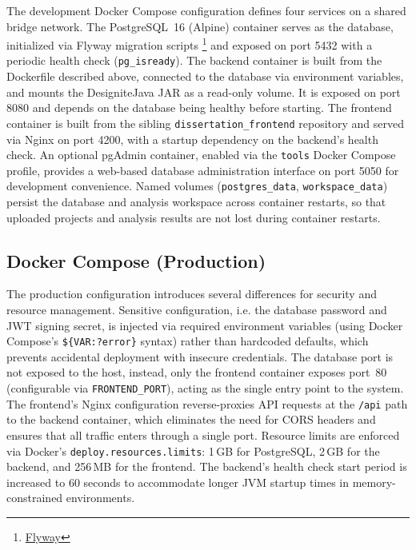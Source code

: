 \par The development Docker Compose configuration defines four services on a shared bridge network. The PostgreSQL~16 (Alpine) container serves as the database, initialized via Flyway migration scripts \footnote{\href{https://github.com/flyway/flyway}{Flyway}} and exposed on port 5432 with a periodic health check (\texttt{pg\_isready}). The backend container is built from the Dockerfile described above, connected to the database via environment variables, and mounts the DesigniteJava JAR as a read-only volume. It is exposed on port 8080 and depends on the database being healthy before starting. The frontend container is built from the sibling \texttt{dissertation\_frontend} repository and served via Nginx on port 4200, with a startup dependency on the backend's health check. An optional pgAdmin container, enabled via the \texttt{tools} Docker Compose profile, provides a web-based database administration interface on port 5050 for development convenience. Named volumes (\texttt{postgres\_data}, \texttt{workspace\_data}) persist the database and analysis workspace across container restarts, so that uploaded projects and analysis results are not lost during container restarts.

\subsection{Docker Compose (Production)}
\label{subsec:docker-prod}

\par The production configuration introduces several differences for security and resource management. Sensitive configuration, i.e. the database password and JWT signing secret, is injected via required environment variables (using Docker Compose's \texttt{\$\{VAR:?error\}} syntax) rather than hardcoded defaults, which prevents accidental deployment with insecure credentials. The database port is not exposed to the host, instead, only the frontend container exposes port~80 (configurable via \texttt{FRONTEND\_PORT}), acting as the single entry point to the system. The frontend's Nginx configuration reverse-proxies API requests at the \texttt{/api} path to the backend container, which eliminates the need for CORS headers and ensures that all traffic enters through a single port. Resource limits are enforced via Docker's \texttt{deploy\-.resources\-.limits}: 1\,GB for PostgreSQL, 2\,GB for the backend, and 256\,MB for the frontend. The backend's health check start period is increased to 60 seconds to accommodate longer JVM startup times in memory-constrained environments.

